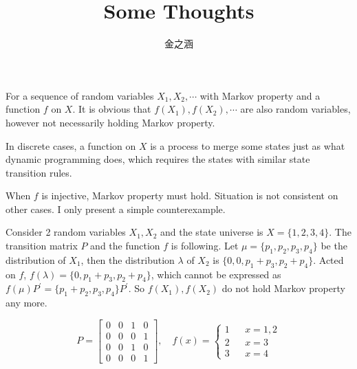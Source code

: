 

\title{Some Thoughts}
\author{金之涵}
\date{}

	\maketitle
	\newpage
	
	\begin{prob}
		For a sequence of random variables $X_1, X_2, \cdots$ with Markov property and a function $f$ on $X$. It is obvious that $f(X_1), f(X_2), \cdots$ are also random variables, however not necessarily holding Markov property.
		
		\sol
		
		In discrete cases, a function on $X$ is a process to merge some states just as what dynamic programming does, which requires the states with similar state transition rules.
		
		When $f$ is injective, Markov property must hold. Situation is not consistent on other cases. I only present a simple counterexample.
		
		Consider 2 random variables $X_1, X_2$ and the state universe is $X = \{1, 2, 3, 4\}$. The transition matrix $P$ and the function $f$ is following. Let $\mu = \{p_1, p_2, p_3, p_4\}$ be the distribution of $X_1$, then the distribution $\lambda$ of $X_2$ is $\{ 0, 0, p_1 + p_3, p_2 + p_4 \}$. Acted on $f$, $f(\lambda) = \{0, p_1 + p_3, p_2 + p_4\}$, which cannot be expressed as $f(\mu)P^\prime = \{p_1 + p_2, p_3, p_4\}P^\prime$. So $f(X_1), f(X_2)$ do not hold Markov property any more.
		
		\begin{equation*}
			P = {
				\left[ \begin{array}{cccc}
				0 & 0 & 1 & 0\\
				0 & 0 & 0 & 1\\
				0 & 0 & 1 & 0\\
				0 & 0 & 0 & 1
				\end{array} 
				\right ]}, \quad
			f(x)=\left\{
				\begin{aligned}
				1 &  & x = 1, 2 \\
				2 &  & x = 3 \\
				3 &  & x = 4
				\end{aligned}
				\right.
		\end{equation*}
		
		
	\end{prob}

